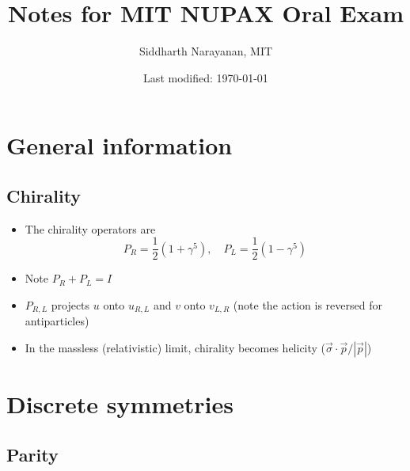 \documentclass[11pt]{article}
\begin{document}
\title{Notes for MIT NUPAX Oral Exam}
\date{Last modified: \today}
\author{Siddharth Narayanan, MIT}

\maketitle

\tableofcontents

\section{General information}
\subsection{Chirality}
\begin{itemize}
  \item The chirality operators are
  \begin{equation}
    P_R = \frac{1}{2} \left(1+\gamma^5\right), \quad P_L = \frac{1}{2} \left(1-\gamma^5\right)
  \end{equation}
  \item Note $P_R+P_L = I$
  \item $P_{R,L}$ projects $u$ onto $u_{R,L}$ and $v$ onto $v_{L,R}$ (note the action is reversed for antiparticles)
  \item In the massless (relativistic) limit, chirality becomes helicity ($\vec\sigma \cdot \vec p / |\vec p|$)
\end{itemize}

\section{Discrete symmetries}
\subsection{Parity}
\end{document}
